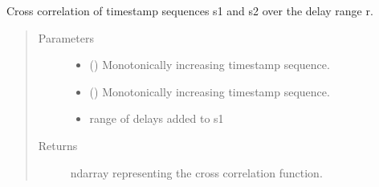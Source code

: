 \documentclass[letterpaper,10pt,english]{sphinxmanual}
\begin{document}
\begin{fulllineitems}
\label{\detokenize{tes:tes.analysis.x_correlation}}
\sphinxAtStartPar
Cross correlation of timestamp sequences s1 and s2 over the delay range r.
\begin{quote}\begin{description}
\item[{Parameters}] \leavevmode\begin{itemize}
\item {} 
\sphinxAtStartPar
{} () \textendash{} Monotonically increasing timestamp sequence.

\item {} 
\sphinxAtStartPar
{} () \textendash{} Monotonically increasing timestamp sequence.

\item {} 
\sphinxAtStartPar
{} \textendash{} range of delays added to s1

\end{itemize}

\item[{Returns}] \leavevmode
\sphinxAtStartPar
ndarray representing the cross correlation function.

\end{description}\end{quote}

\end{fulllineitems}

\end{document}

